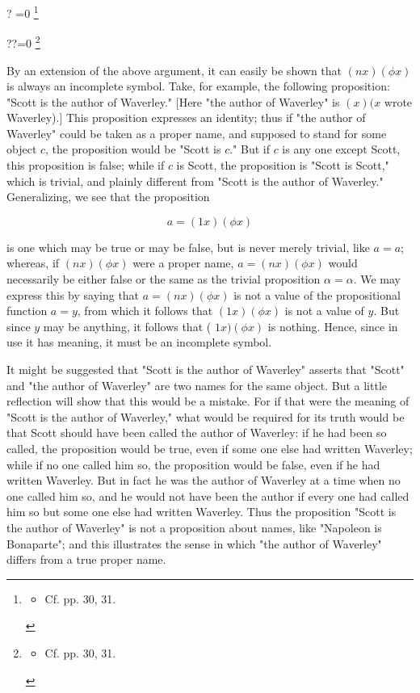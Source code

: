 \documentclass[10pt]{article}
\let\svthefootnote\thefootnote
\newcommand\blfootnotetext[1]{%
  \let\thefootnote\relax\footnote{#1}%
  \addtocounter{footnote}{-1}%
  \let\thefootnote\svthefootnote%
}
\let\svfootnotetext\footnotetext
\renewcommand\footnotetext[2][?]{%
  \if\relax#1\relax%
    \ifnum\value{footnote}=0\blfootnotetext{#2}\else\svfootnotetext{#2}\fi%
  \else%
    \if?#1\ifnum\value{footnote}=0\blfootnotetext{#2}\else\svfootnotetext{#2}\fi%
    \else\svfootnotetext[#1]{#2}\fi%
  \fi
}
\begin{document}
\footnotetext{\begin{itemize}
  \item Cf. pp. 30, 31.
\end{itemize}
}By an extension of the above argument, it can easily be shown that $(n x)(\phi x)$ is always an incomplete symbol. Take, for example, the following proposition: "Scott is the author of Waverley." [Here "the author of Waverley" is $(x)(x$ wrote Waverley).] This proposition expresses an identity; thus if "the author of Waverley" could be taken as a proper name, and supposed to stand for some object $c$, the proposition would be "Scott is $c$." But if $c$ is any one except Scott, this proposition is false; while if $c$ is Scott, the proposition is "Scott is Scott," which is trivial, and plainly different from "Scott is the author of Waverley." Generalizing, we see that the proposition

$$
a=(1 x)(\phi x)
$$

is one which may be true or may be false, but is never merely trivial, like $a=a$; whereas, if $(n x)(\phi x)$ were a proper name, $a=(n x)(\phi x)$ would necessarily be either false or the same as the trivial proposition $\alpha=\alpha$. We may express this by saying that $a=(n x)(\phi x)$ is not a value of the propositional function $a=y$, from which it follows that $(1 x)(\phi x)$ is not a value of $y$. But since $y$ may be anything, it follows that ( $1 x)(\phi x)$ is nothing. Hence, since in use it has meaning, it must be an incomplete symbol.

It might be suggested that "Scott is the author of Waverley" asserts that "Scott" and "the author of Waverley" are two names for the same object. But a little reflection will show that this would be a mistake. For if that were the meaning of "Scott is the author of Waverley," what would be required for its truth would be that Scott should have been called the author of Waverley: if he had been so called, the proposition would be true, even if some one else had written Waverley; while if no one called him so, the proposition would be false, even if he had written Waverley. But in fact he was the author of Waverley at a time when no one called him so, and he would not have been the author if every one had called him so but some one else had written Waverley. Thus the proposition "Scott is the author of Waverley" is not a proposition about names, like "Napoleon is Bonaparte"; and this illustrates the sense in which "the author of Waverley" differs from a true proper name.
\end{document}
